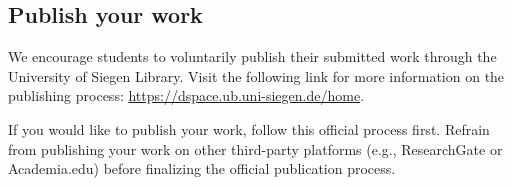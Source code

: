 \subsection{Publish your work}
\label{sec:publish}
We encourage students to voluntarily publish their submitted work through the University of Siegen Library. Visit the following link for more information on the publishing process: \href{https://dspace.ub.uni-siegen.de/home}{https://dspace.ub.uni-siegen.de/home}.

If you would like to publish your work, follow this official process first. Refrain from publishing your work on other third-party platforms (e.g., ResearchGate or Academia.edu) before finalizing the official publication process.
